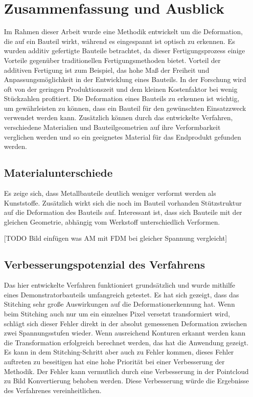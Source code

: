 
\chapter{Zusammenfassung und Ausblick}

Im Rahmen dieser Arbeit wurde eine Methodik entwickelt um 
die Deformation, die auf ein Bauteil wirkt, während es eingespannt 
ist optisch zu erkennen. Es wurden additiv gefertigte Bauteile 
betrachtet, da dieser Fertigungsprozess einige Vorteile gegenüber
traditionellen Fertigungsmethoden bietet. 
Vorteil der additiven Fertigung ist zum Beispiel, das hohe Maß der Freiheit und 
Anpassungsmöglichkeit in der Entwicklung eines Bauteils. In der Forschung 
wird oft von der geringen Produktionszeit und dem kleinen Kostenfaktor 
bei wenig Stückzahlen profitiert. Die Deformation eines Bauteils zu 
erkennen ist wichtig, um gewährleisten zu können, dass ein Bauteil für 
den gewünschten Einsatzzweck verwendet werden kann. Zusätzlich können 
durch das entwickelte Verfahren, verschiedene Materialien und Bauteilgeometrien 
auf ihre Verformbarkeit verglichen werden und so ein geeignetes Material 
für das Endprodukt gefunden werden.

\section{Materialunterschiede}

Es zeige sich, dass Metallbauteile deutlich weniger verformt werden als 
Kunststoffe. Zusätzlich wirkt sich die noch im Bauteil vorhanden Stützstruktur 
auf die Deformation des Bauteils auf. 
Interessant ist, dass sich Bauteile mit der gleichen Geometrie, abhängig vom 
Werkstoff unterschiedlich Verformen. 

[TODO Bild einfügen was AM mit FDM bei gleicher Spannung vergleicht]

\section{Verbesserungspotenzial des Verfahrens}

Das hier entwickelte Verfahren funktioniert grundsätzlich und wurde mithilfe 
eines Demonstratorbauteils umfangreich getestet. Es hat sich gezeigt, dass 
das Stitching sehr große Auswirkungen auf die Deformationerkennung hat. 
Wenn beim Stitching auch nur um ein einzelnes Pixel versetzt transformiert wird,
schlägt sich dieser Fehler direkt in der absolut gemessenen 
Deformation zwischen zwei Spannungsstufen wieder.
Wenn ausreichend Konturen erkannt werden kann die Transformation erfolgreich
berechnet werden, das hat die Anwendung gezeigt. Es kann in dem Stitching-Schritt
aber auch zu Fehler kommen, dieses Fehler auftreten zu beseitigen hat eine hohe Priorität 
bei einer Verbesserung der Methodik. 
Der Fehler kann vermutlich durch eine Verbesserung in der Pointcloud zu Bild 
Konvertierung behoben werden. Diese Verbesserung würde die Ergebnisse 
des Verfahrenes vereinheitlichen. 

